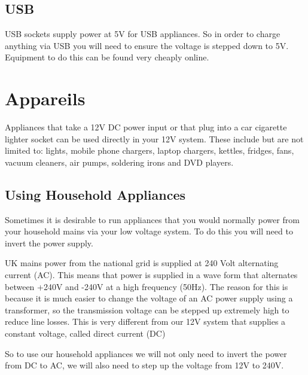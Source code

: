 \documentclass{article}
\theoremstyle{definition}
\theoremstyle{definition}
\theoremstyle{remark}
\begin{document}

  {\color{blue}\subsection{USB}} %
  \label{sub:usb}

    USB sockets supply power at 5V for USB appliances. So in order to charge anything via USB you will need to ensure the voltage is stepped down to 5V. Equipment to do this can be found very cheaply online. 
  


{\color{blue}\section{Appareils}} %
\label{sec:appareils}

  Appliances that take a 12V DC power input or that plug into a car cigarette lighter socket can be used directly in your 12V system. These include but are not limited to: lights, mobile phone chargers, laptop chargers, kettles, fridges, fans, vacuum cleaners, air pumps, soldering irons and DVD players. 

  {\color{blue}\subsection{Using Household Appliances}} %
  \label{sub:using_household_appliances}

    Sometimes it is desirable to run appliances that you would normally power from your household mains via your low voltage system. To do this you will need to invert the power supply.

    UK mains power from the national grid is supplied at 240 Volt alternating current (AC). This means that power is supplied in a wave form that alternates between +240V and -240V at a high frequency (50Hz). The reason for this is because it is much easier to change the voltage of an AC power supply using a transformer, so the transmission voltage can be stepped up extremely high to reduce line losses. This is very different from our 12V system that supplies a constant voltage, called direct current (DC)

    So to use our household appliances we will not only need to invert the power from DC to AC, we will also need to step up the voltage from 12V to 240V.
  
\end{document}
